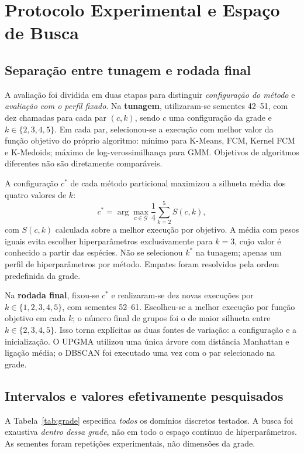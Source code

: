 \documentclass[conference,a4paper]{IEEEtran}
\begin{document}
\section{Protocolo Experimental e Espaço de Busca}
\subsection{Separação entre tunagem e rodada final}
A avaliação foi dividida em duas etapas para distinguir \emph{configuração do método} e \emph{avaliação com o perfil fixado}. Na \textbf{tunagem}, utilizaram-se sementes 42--51, com dez chamadas para cada par $(c,k)$, sendo $c$ uma configuração da grade e $k\in\{2,3,4,5\}$. Em cada par, selecionou-se a execução com melhor valor da função objetivo do próprio algoritmo: mínimo para K-Means, FCM, Kernel FCM e K-Medoids; máximo de log-verossimilhança para GMM. Objetivos de algoritmos diferentes não são diretamente comparáveis.

A configuração $c^*$ de cada método particional maximizou a silhueta média dos quatro valores de $k$:
\begin{equation}
 c^*=\arg\max_{c\in\mathcal{G}}\frac{1}{4}\sum_{k=2}^{5}S(c,k),
 \label{eq:search}
\end{equation}
com $S(c,k)$ calculada sobre a melhor execução por objetivo. A média com pesos iguais evita escolher hiperparâmetros exclusivamente para $k=3$, cujo valor é conhecido a partir das espécies. Não se selecionou $k^*$ na tunagem; apenas um perfil de hiperparâmetros por método. Empates foram resolvidos pela ordem predefinida da grade.

Na \textbf{rodada final}, fixou-se $c^*$ e realizaram-se dez novas execuções por $k\in\{1,2,3,4,5\}$, com sementes 52--61. Escolheu-se a melhor execução por função objetivo em cada $k$; o número final de grupos foi o de maior silhueta entre $k\in\{2,3,4,5\}$. Isso torna explícitas as duas fontes de variação: a configuração e a inicialização. O UPGMA utilizou uma única árvore com distância Manhattan e ligação média; o DBSCAN foi executado uma vez com o par selecionado na grade.

\subsection{Intervalos e valores efetivamente pesquisados}
A Tabela~\ref{tab:grade} especifica \emph{todos} os domínios discretos testados. A busca foi exaustiva \emph{dentro dessa grade}, não em todo o espaço contínuo de hiperparâmetros. As sementes foram repetições experimentais, não dimensões da grade.
\end{document}
